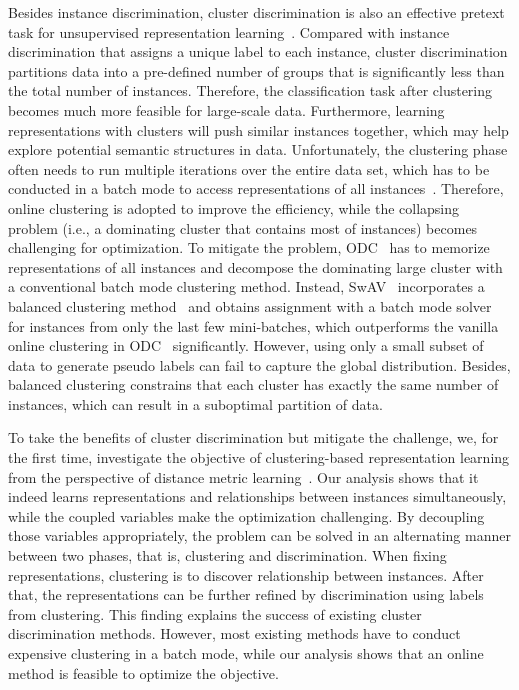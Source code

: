 \documentclass[10pt,twocolumn,letterpaper]{article}
\begin{document}
Besides instance discrimination, cluster discrimination is also an effective pretext task for unsupervised representation learning~\cite{AsanoRV20a,CaronBJD18,CaronMMGBJ20,abs-2005-04966,ZhuangZY19,ZhanX0OL20,abs-2104-14294}. Compared with instance discrimination that assigns a unique label to each instance, cluster discrimination partitions data into a pre-defined number of groups that is significantly less than the total number of instances. Therefore, the classification task after clustering becomes much more feasible for large-scale data. Furthermore, learning representations with clusters will push similar instances together, which may help explore potential semantic structures in data. Unfortunately, the clustering phase often needs to run multiple iterations over the entire data set, which has to be conducted in a batch mode to access representations of all instances~\cite{CaronBJD18}. Therefore, online clustering is adopted to improve the efficiency, while the collapsing problem (i.e., a dominating cluster that contains most of instances) becomes challenging for optimization. To mitigate the problem, ODC~\cite{ZhanX0OL20} has to memorize representations of all instances and decompose the dominating large cluster with a conventional batch mode clustering method. Instead, SwAV~\cite{CaronMMGBJ20} incorporates a balanced clustering method~\cite{AsanoRV20a} and obtains assignment with a batch mode solver for instances from only the last few mini-batches, which outperforms the vanilla online clustering in ODC~\cite{ZhanX0OL20} significantly. However, using only a small subset of data to generate pseudo labels can fail to capture the global distribution. Besides, balanced clustering constrains that each cluster has exactly the same number of instances, which can result in a suboptimal partition of data.

To take the benefits of cluster discrimination but mitigate the challenge, we, for the first time, investigate the objective of clustering-based representation learning from the perspective of distance metric learning~\cite{QianSSHTLJ19}. Our analysis shows that it indeed learns representations and relationships between instances simultaneously, while the coupled variables make the optimization challenging. By decoupling those variables appropriately, the problem can be solved in an alternating manner between two phases, that is, clustering and discrimination. When fixing representations, clustering is to discover relationship between instances. After that, the representations can be further refined by discrimination using labels from clustering. This finding explains the success of existing cluster discrimination methods. However, most existing methods have to conduct expensive clustering in a batch mode, while our analysis shows that an online method is feasible to optimize the objective. 
\end{document}
